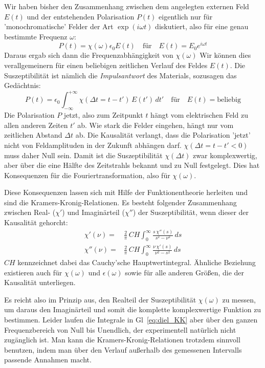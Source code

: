 Wir haben bisher den Zusammenhang zwischen dem angelegten externen Feld $E(t)$ und der entstehenden Polarisation $P(t)$ eigentlich nur für 'monochromatische' Felder der Art $\exp(i \omega t)$ diskutiert, also für eine genau bestimmte Frequenz $\omega$:
\begin{equation}
P(t) = \chi(\omega) \epsilon_0 E(t) \quad \text{für} \quad E(t) = E_0 e^{i \omega t}
\end{equation}
Daraus ergab sich dann die Frequenzabhängigkeit von $\chi(\omega)$ Wir können dies verallgemeinern für einen beliebigen zeitlichen Verlauf des Feldes  $E(t)$. Die Suszeptibilität ist nämlich die  \emph{Impulsantwort} des Materials, sozusagen das Gedächtnis:
\begin{equation}
P(t) = \epsilon_0 \int_{-\infty}^{+\infty} \chi( \Delta t = t - t') \, E(t') \, dt' \quad \text{für} \quad E(t) = \text{beliebig}
\end{equation}
Die Polarisation $P$ jetzt, also zum Zeitpunkt $t$ hängt vom elektrischen Feld zu allen anderen Zeiten $t'$ ab. Wie stark die Felder eingehen, hängt nur vom zeitlichen Abstand $\Delta t$ ab. Die Kausalität verlangt, dass die Polarisation 'jetzt' nicht von Feldamplituden in der Zukunft abhängen darf. $\chi( \Delta t = t - t' < 0) $ muss daher Null sein. Damit ist die Suszeptibilität $\chi( \Delta t ) $ zwar komplexwertig, aber über die eine Hälfte des Zeitstrahls bekannt und zu Null festgelegt. Dies hat Konsequenzen für die Fouriertransformation, also für $\chi(\omega)$.

Diese Konsequenzen lassen sich mit Hilfe der Funktionentheorie herleiten und sind die Kramers-Kronig-Relationen. Es besteht folgender Zusammenhang zwischen Real- ($\chi'$) und Imaginärteil  ($\chi''$) der Suszeptibilität, wenn dieser der Kausalität gehorcht:
\begin{align}
 \chi'(\nu) = & \frac{2}{\pi} \, CH \int_0^\infty \frac{s  \, \chi''(s)}{s^2 - \nu^2} \, ds \\
 \chi''(\nu) = & \frac{2}{\pi}\,  CH \int_0^\infty \frac{\nu \, \chi'(s)}{\nu^2 - s^2} \, ds 
 \label{eq:diel_KK}
\end{align}
$CH$ kennzeichnet dabei das Cauchy'sche Hauptwertintegral. Ähnliche Beziehung existieren auch für $\chi(\omega)$ und $\epsilon(\omega)$ sowie für alle anderen Größen, die der Kausalität unterliegen.

Es reicht also im Prinzip aus, den Realteil der Suszeptibilität $\chi(\omega)$ zu messen, um daraus den Imaginärteil und somit die komplette komplexwertige Funktion zu bestimmen. Leider laufen die Integrale in Gl~\ref{eq:diel_KK} aber über den ganzen Frequenzbereich von Null bis Unendlich, der experimentell natürlich nicht zugänglich ist. Man kann die Kramers-Kronig-Relationen trotzdem sinnvoll benutzen, indem man über den Verlauf außerhalb des gemessenen Intervalls passende Annahmen macht.




\printbibliography[segment=\therefsegment,heading=subbibliography]
